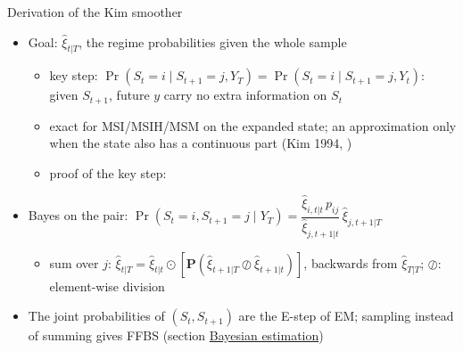 \begin{frame}{Derivation of the Kim smoother}
\itemsize{\small}
\begin{itemize}
    \item Goal: $\hat\xi_{t|T}$, the regime probabilities given the whole sample 
    \begin{itemize}
        \item key step: $\Pr(S_t = i \mid S_{t+1} = j, Y_T) = \Pr(S_t = i \mid S_{t+1} = j, Y_t)$: given $S_{t+1}$, future $y$ carry no extra information on $S_t$
        \item exact for MSI/MSIH/MSM on the expanded state; an approximation only when the state also has a continuous part (Kim 1994, )
        \item proof of the key step:   %
    \end{itemize}
    \item Bayes on the pair: $\Pr(S_t = i, S_{t+1} = j \mid Y_T) = \dfrac{\hat\xi_{i,t|t}\,p_{ij}}{\hat\xi_{j,t+1|t}}\,\hat\xi_{j,t+1|T}$
    \begin{itemize}
        \item sum over $j$: $\hat\xi_{t|T} = \hat\xi_{t|t}\odot\left[\mathbf{P}(\hat\xi_{t+1|T}\oslash\hat\xi_{t+1|t})\right]$, backwards from $\hat\xi_{T|T}$; $\oslash$: element-wise division
    \end{itemize}
    \item The joint probabilities of $(S_t, S_{t+1})$ are the E-step of EM; sampling instead of summing gives FFBS (section \hyperlink{ch7bayes}{\textcolor{MainBlue}{Bayesian estimation}})
\end{itemize}
\end{frame}

